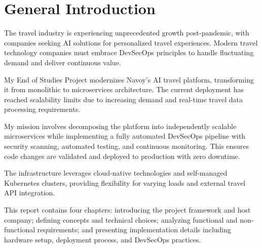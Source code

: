 \thispagestyle{plain} %
\section*{General Introduction}
The travel industry is experiencing unprecedented growth post-pandemic, with companies seeking AI solutions for personalized travel experiences. Modern travel technology companies must embrace DevSecOps principles to handle fluctuating demand and deliver continuous value.

My End of Studies Project modernizes Navoy's AI travel platform, transforming it from monolithic to microservices architecture. The current deployment has reached scalability limits due to increasing demand and real-time travel data processing requirements.

My mission involves decomposing the platform into independently scalable microservices while implementing a fully automated DevSecOps pipeline with security scanning, automated testing, and continuous monitoring. This ensures code changes are validated and deployed to production with zero downtime.

The infrastructure leverages cloud-native technologies and self-managed Kubernetes clusters, providing flexibility for varying loads and external travel API integration.

This report contains four chapters: introducing the project framework and host company; defining concepts and technical choices; analyzing functional and non-functional requirements; and presenting implementation details including hardware setup, deployment process, and DevSecOps practices.

\newpage
